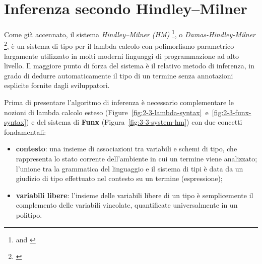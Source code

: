 \section{Inferenza secondo Hindley–Milner}
\label{sec:3-4-hm-type-inference}

Come già accennato, il sistema \textit{Hindley–Milner (HM)}%
\footnote{ \cite{Hindley-1969-SchemeObject}
    and  \cite{Milner-1978-TheoryPolymorphism}},
o \textit{Damas-Hindley-Milner}%
\footnote{ \cite{Damas-1982-PrincipalSchemes}},
è un sistema di tipo per il lambda calcolo con polimorfismo parametrico largamente utilizzato
in molti moderni linguaggi di programmazione ad alto livello. Il maggiore punto di forza del sistema
è il relativo metodo di inferenza, in grado di dedurre automaticamente il tipo di un termine
senza annotazioni esplicite fornite dagli sviluppatori.


Prima di presentare l'algoritmo di inferenza è necessario complementare le nozioni di lambda calcolo esteso
(Figure~\ref{fig:2-3-lambda-syntax}~e~\ref{fig:2-3-funx-syntax}) e del sistema di \textbf{Funx} (Figura~\ref{fig:3-3-system-hm})
con due concetti fondamentali:
\begin{itemize}
    \item \textbf{contesto}: una insieme di associazioni tra variabili e schemi di tipo,
          che rappresenta lo stato corrente dell'ambiente in cui un termine viene analizzato; l'unione tra la grammatica
          del linguaggio e il sistema di tipi è data da un giudizio di tipo effettuato nel contesto su un termine (espressione);
    \item \textbf{variabili libere}: l'insieme delle variabili libere di un tipo è semplicemente il complemento
          delle variabili vincolate, quantificate universalmente in un politipo.
\end{itemize}


